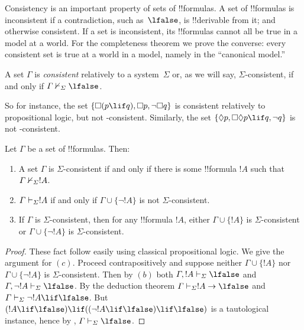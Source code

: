 \documentclass[../../../include/open-logic-section]{subfiles}
\begin{document}


Consistency is an important property of sets of !!{formula}s. A set of
!!{formula}s is inconsistent if a contradiction, such as~$\lfalse$, is
!!{derivable} from it; and otherwise consistent. If a set is
inconsistent, its !!{formula}s cannot all be true in a model at a
world. For the completeness theorem we prove the converse: every
consistent set is true at a world in a model, namely in the ``canonical
model.''

\begin{defn}
  A set $\Gamma$ is \emph{consistent} relatively to a system~$\Sigma$
  or, as we will say, $\Sigma$-consistent, if and only if $\Gamma
  \Proves/[\Sigma] \lfalse$.
\end{defn}

So for instance, the set $\{ \Box(p \lif q), \Box p, \lnot\Box q \}$ is
consistent relatively to propositional logic, but not
-consistent. Similarly, the set $\{ \Diamond p, \Box\Diamond
p \lif q, \lnot q \}$ is not -consistent.

\begin{prop}
  Let $\Gamma$ be a set of !!{formula}s. Then:
  \begin{enumerate}
  \item A set $\Gamma$ is $\Sigma$-consistent if and only if there is
    some !!{formula} $!A$ such that $\Gamma \Proves/[\Sigma]
    !A$.
  \item {}%
    $\Gamma \Proves[\Sigma] !A$ if and only if $\Gamma \cup \{
    \lnot!A \}$ is not $\Sigma$-consistent.
  \item {}%
    If $\Gamma$ is $\Sigma$-consistent, then for any !!{formula}
    $!A$, either $\Gamma \cup \{ !A \}$ is
    $\Sigma$-consistent or $\Gamma \cup \{ \lnot!A \}$ is
    $\Sigma$-consistent.
  \end{enumerate}
\end{prop}

\begin{proof}
  These fact follow easily using classical propositional logic. We
  give the argument for $(c)$. Proceed contrapositively and suppose
  neither $\Gamma \cup \{ !A \}$ nor $\Gamma \cup \{ \lnot!A \}$ is
  $\Sigma$-consistent. Then by $(b)$ both $\Gamma, !A \Proves[\Sigma]
  \lfalse$ and $\Gamma, \lnot !A \Proves[\Sigma] \lfalse$. By the
  deduction theorem $\Gamma \Proves[\Sigma] !A \to \lfalse$ and
  $\Gamma \Proves[\Sigma] \lnot!A \lif \lfalse$. But $(!A \lif
  \lfalse) \lif ((\lnot!A \lif \lfalse) \lif \lfalse)$ is a
  tautological instance, hence by
  ,
  $\Gamma \Proves[\Sigma] \lfalse$.
\end{proof}
\end{document}

